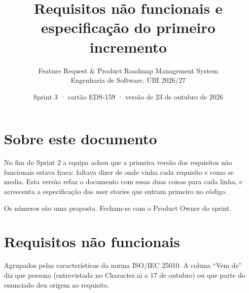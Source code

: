 \documentclass[11pt,a4paper]{article}
\title{Requisitos não funcionais e especificação do primeiro incremento}
\author{Feature Request \& Product Roadmap Management System\\Engenharia de Software, UBI 2026/27}
\date{Sprint 3 · cartão EDS-159 · versão de 23 de outubro de 2026}
\begin{document}
\maketitle

\section*{Sobre este documento}

No fim do Sprint 2 a equipa achou que a primeira versão dos requisitos não funcionais estava fraca: faltava dizer de onde vinha cada requisito e como se media. Esta versão refaz o documento com essas duas coisas para cada linha, e acrescenta a especificação das user stories que entram primeiro no código.

Os números são uma proposta. Fecham-se com o Product Owner do sprint.

\section{Requisitos não funcionais}

Agrupados pelas características da norma ISO/IEC 25010. A coluna ``Vem de'' diz que persona (entrevistada no Character.ai a 17 de outubro) ou que parte do enunciado deu origem ao requisito.
\end{document}
